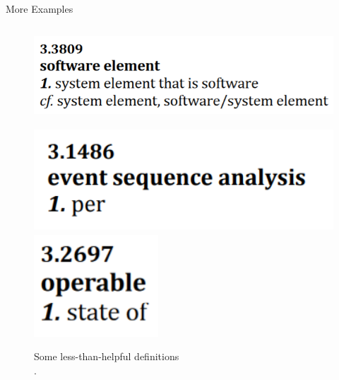 \documentclass[22pt]{beamer}
\begin{document}
\begin{frame}[fragile]
\begin{textblock}{7.25}
\begin{block}{\fontsize{37}{20}\selectfont More Examples}
\begin{columns}
\begin{column}{0.425\textwidth}
\begin{center}
                        \begin{figure}
                            \vspace{12mm}
                            \includegraphics[width=\textwidth]{software element.png}

                            \vspace{2mm}

                            \includegraphics[height=3.9cm]{per.png}
                            \includegraphics[height=3.8cm]{state of.png}
                            \caption{Some less-than-helpful definitions\\
                                \cite[pp.~421, 170, 301, counterclockwise from top]{IEEE2017}.}
                            \label{Fig:unhelpful-defs}
                        \end{figure}
                    \end{center}
                \end{column}
            \end{columns}

            \quad\\ %


\end{block}
\end{textblock}
\end{frame}
\end{document}
